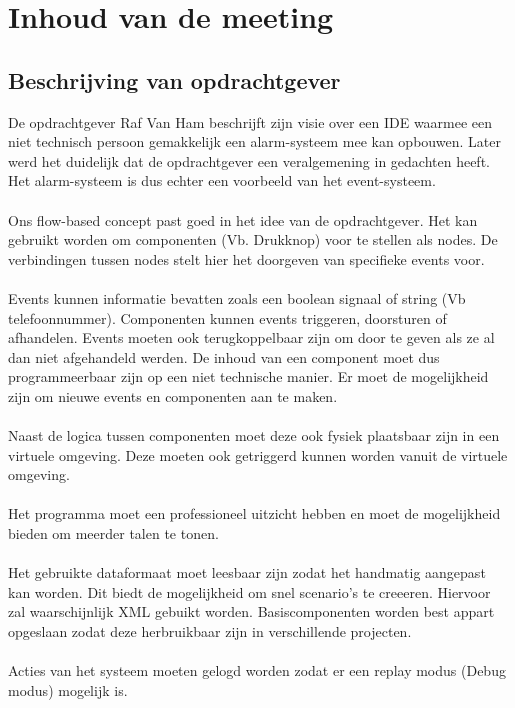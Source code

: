 \documentclass[]{article}
\begin{document}
\section{Inhoud van de meeting}
\subsection{Beschrijving van opdrachtgever}
De opdrachtgever Raf Van Ham beschrijft zijn visie over een IDE waarmee een niet technisch persoon gemakkelijk een alarm-systeem mee kan opbouwen. Later werd het duidelijk dat de opdrachtgever een veralgemening in gedachten heeft. Het alarm-systeem is dus echter een voorbeeld van het event-systeem.\\\\
Ons flow-based concept past goed in het idee van de opdrachtgever. Het kan gebruikt worden om componenten (Vb. Drukknop) voor te stellen als nodes. De verbindingen tussen nodes stelt hier het doorgeven van specifieke events voor.\\\\
Events kunnen informatie bevatten zoals een boolean signaal of string (Vb telefoonnummer). Componenten kunnen events triggeren, doorsturen of afhandelen. Events moeten ook terugkoppelbaar zijn om door te geven als ze al dan niet afgehandeld werden. De inhoud van een component moet dus programmeerbaar zijn op een niet technische manier. Er moet de mogelijkheid zijn om nieuwe events en componenten aan te maken.\\\\
Naast de logica tussen componenten moet deze ook fysiek plaatsbaar zijn in een virtuele omgeving. Deze moeten ook getriggerd kunnen worden vanuit de virtuele omgeving.\\\\
Het programma moet een professioneel uitzicht hebben en moet de mogelijkheid bieden om meerder talen te tonen.\\\\
Het gebruikte dataformaat moet leesbaar zijn zodat het handmatig aangepast kan worden. Dit biedt de mogelijkheid om snel scenario's te creeeren. Hiervoor zal waarschijnlijk XML gebuikt worden. Basiscomponenten worden best appart opgeslaan zodat deze herbruikbaar zijn in verschillende projecten.\\\\
Acties van het systeem moeten gelogd worden zodat er een replay modus (Debug modus) mogelijk is. 
 
\end{document}
